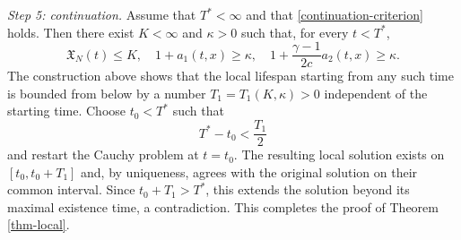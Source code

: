 \documentclass[10pt,reqno]{amsart}
\numberwithin{equation}{section}
\begin{document}
\medskip
\noindent\emph{Step 5: continuation.} Assume that $T^*<\infty$ and that \eqref{continuation-criterion} holds. Then there exist $K<\infty$ and $\kappa>0$ such that, for every $t<T^*$,
\[
\mathfrak X_N(t)\le K, \quad 1+a_1(t,x)\ge\kappa, \quad 1+\frac{\gamma-1}{2c}a_2(t,x)\ge\kappa.
\]
The construction above shows that the local lifespan starting from any such time is bounded from below by a number $T_1=T_1(K,\kappa)>0$ independent of the starting time. Choose $t_0<T^*$ such that
\[
T^*-t_0<\frac{T_1}{2}
\]
and restart the Cauchy problem at $t=t_0$. The resulting local solution exists on $[t_0,t_0+T_1]$ and, by uniqueness, agrees with the original solution on their common interval. Since $t_0+T_1>T^*$, this extends the solution beyond its maximal existence time, a contradiction. This completes the proof of Theorem \ref{thm-local}.
 
 

%
%
%
%
 





 
 
\end{document}
